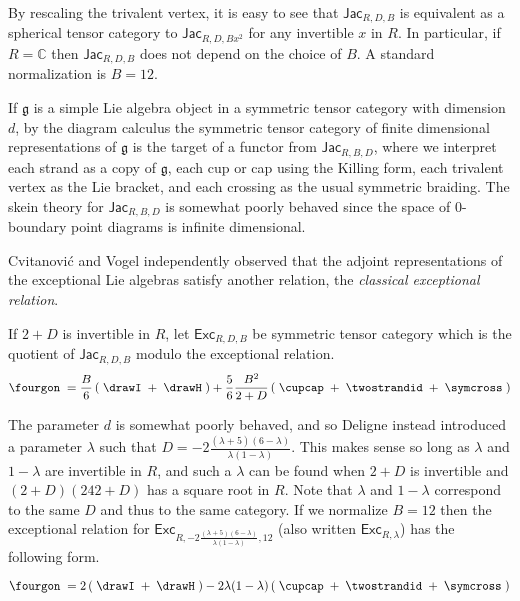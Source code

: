 \documentclass[12pt]{amsart}
\begin{document}
By rescaling the trivalent vertex, it is easy to see that
$\mathsf{Jac}_{R,D,B}$ is equivalent as a spherical tensor category to
$\mathsf{Jac}_{R,D,Bx^2}$ for any invertible $x$ in $R$.  In particular, if $R
= \mathbb{C}$ then $\mathsf{Jac}_{R,D,B}$ does not depend on the choice of
$B$.  A standard normalization is $B=12$.

If $\mathfrak{g}$ is a simple Lie algebra object in a symmetric tensor
category with dimension $d$, by the diagram calculus  the symmetric tensor
category of finite dimensional representations of $\mathfrak{g}$ is the target
of a functor from $\mathsf{Jac}_{R,B,D}$, where we interpret each strand as a
copy of $\mathfrak{g}$, each cup or cap using the Killing form, each trivalent
vertex as the Lie bracket, and each crossing as the usual symmetric braiding.
The skein theory for $\mathsf{Jac}_{R,B,D}$ is somewhat poorly behaved
since the space of $0$-boundary
point diagrams is infinite dimensional.

Cvitanović \cite{MR2418111} and Vogel \cite{MR2769234}
independently observed that the adjoint
representations of the exceptional Lie algebras satisfy another relation, the
\emph{classical exceptional relation}.

\begin{definition}
If $2+D$ is invertible in $R$, let $\mathsf{Exc}_{R,D,B}$ be symmetric tensor category which is the quotient of 
$\mathsf{Jac}_{R,D,B}$ modulo the exceptional relation.
\begin{equation}
\fourgon\; = \frac{B}{6} \left(\;\drawI\; + \;\drawH\; \right)
 + \frac{5}{6}\frac{B^2}{2+D} \left( \;\cupcap\; + \;\twostrandid\; + \;\symcross\; \right)
\label{eq:classical-except}
\end{equation}
\end{definition}

The parameter $d$ is somewhat poorly behaved, and so Deligne instead
introduced a parameter $\lambda$ such that $D = -2
\frac{(\lambda+5)(6-\lambda)}{\lambda(1-\lambda)}$.  This makes sense so long
as $\lambda$ and $1-\lambda$ are invertible in $R$, and such a $\lambda$ can
be found when $2+D$ is invertible and $(2+D)(242+D)$ has a square root in $R$.
Note that $\lambda$ and $1-\lambda$ correspond to the same $D$ and thus to the
same category.  If we normalize $B=12$ then the exceptional relation for
$\mathsf{Exc}_{R,-2   \frac{(\lambda+5)(6-\lambda)}{\lambda(1-\lambda)},12}$
(also written $\mathsf{Exc}_{R,\lambda}$) has the following form.

\begin{equation}
\fourgon\; = 2\left(\;\drawI\; + \;\drawH\;\right)
 - 2\lambda(1-\lambda) \left( \;\cupcap\; + \;\twostrandid\; + \;\symcross\; \right)
\label{eq:classical-except-2}
\end{equation}
\end{document}
